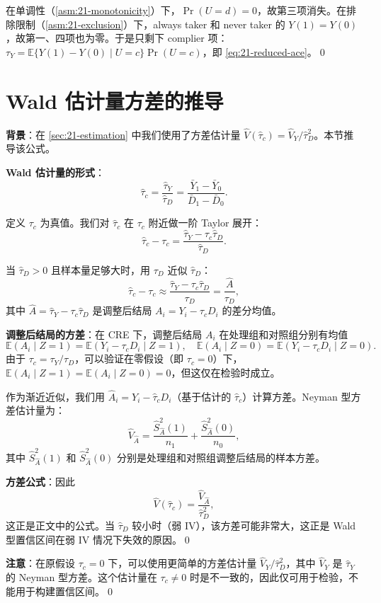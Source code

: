 在单调性（\cref{asm:21-monotonicity}）下，$\Pr(U = d) = 0$，故第三项消失。在排除限制（\cref{asm:21-exclusion}）下，always taker 和 never taker 的 $Y(1) = Y(0)$，故第一、四项也为零。于是只剩下 complier 项：$\tau_Y = \mathbb{E}\{Y(1) - Y(0) \mid U = c\} \Pr(U = c)$，即 \cref{eq:21-reduced-ace}。\qed

\section{Wald 估计量方差的推导}\label{sec:appendix-21-wald-variance}

\textbf{背景}：在 \cref{sec:21-estimation} 中我们使用了方差估计量 $\hat{V}(\hat{\tau}_c) = \hat{V}_Y / \hat{\tau}_D^2$。本节推导该公式。

\textbf{Wald 估计量的形式}：
\[
\hat{\tau}_c = \frac{\hat{\tau}_Y}{\hat{\tau}_D} = \frac{\bar{Y}_1 - \bar{Y}_0}{\bar{D}_1 - \bar{D}_0}.
\]

定义 $\tau_c$ 为真值。我们对 $\hat{\tau}_c$ 在 $\tau_c$ 附近做一阶 Taylor 展开：
\[
\hat{\tau}_c - \tau_c = \frac{\hat{\tau}_Y - \tau_c \hat{\tau}_D}{\hat{\tau}_D}.
\]

当 $\hat{\tau}_D > 0$ 且样本量足够大时，用 $\tau_D$ 近似 $\hat{\tau}_D$：
\[
\hat{\tau}_c - \tau_c \approx \frac{\hat{\tau}_Y - \tau_c \hat{\tau}_D}{\tau_D} = \frac{\hat{A}}{\tau_D},
\]
其中 $\hat{A} = \hat{\tau}_Y - \tau_c \hat{\tau}_D$ 是调整后结局 $A_i = Y_i - \tau_c D_i$ 的差分均值。

\textbf{调整后结局的方差}：在 CRE 下，调整后结局 $A_i$ 在处理组和对照组分别有均值
\[
\mathbb{E}(A_i \mid Z = 1) = \mathbb{E}(Y_i - \tau_c D_i \mid Z = 1),\quad
\mathbb{E}(A_i \mid Z = 0) = \mathbb{E}(Y_i - \tau_c D_i \mid Z = 0).
\]
由于 $\tau_c = \tau_Y / \tau_D$，可以验证在零假设（即 $\tau_c = 0$）下，$\mathbb{E}(A_i \mid Z = 1) = \mathbb{E}(A_i \mid Z = 0) = 0$，但这仅在检验时成立。

作为渐近近似，我们用 $\hat{A}_i = Y_i - \hat{\tau}_c D_i$（基于估计的 $\hat{\tau}_c$）计算方差。Neyman 型方差估计量为：
\[
\hat{V}_{\hat{A}} = \frac{\hat{S}_{\hat{A}}^2(1)}{n_1} + \frac{\hat{S}_{\hat{A}}^2(0)}{n_0},
\]
其中 $\hat{S}_{\hat{A}}^2(1)$ 和 $\hat{S}_{\hat{A}}^2(0)$ 分别是处理组和对照组调整后结局的样本方差。

\textbf{方差公式}：因此
\[
\hat{V}(\hat{\tau}_c) = \frac{\hat{V}_{\hat{A}}}{\hat{\tau}_D^2},
\]
这正是正文中的公式。当 $\hat{\tau}_D$ 较小时（弱 IV），该方差可能非常大，这正是 Wald 型置信区间在弱 IV 情况下失效的原因。\qed

\textbf{注意}：在原假设 $\tau_c = 0$ 下，可以使用更简单的方差估计量 $\hat{V}_Y / \hat{\tau}_D^2$，其中 $\hat{V}_Y$ 是 $\hat{\tau}_Y$ 的 Neyman 型方差。这个估计量在 $\tau_c \neq 0$ 时是不一致的，因此仅可用于检验，不能用于构建置信区间。\qed

